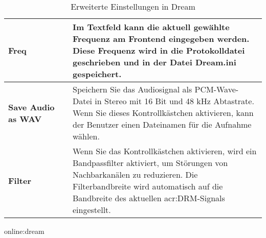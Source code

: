 \begin{table}[htb]
\begin{center}
\begin{tabular}{|p{0.25\linewidth} | p{0.75\linewidth}|}
			\midrule
			\textbf{Freq} & Im Textfeld kann die aktuell gewählte Frequenz am Frontend eingegeben werden. Diese Frequenz wird in die Protokolldatei geschrieben und in der Datei Dream.ini gespeichert.
			\\
			\midrule
			\textbf{Save Audio as WAV} & Speichern Sie das Audiosignal als PCM-Wave-Datei in Stereo mit 16 Bit und 48 kHz Abtastrate. Wenn Sie dieses Kontrollkästchen aktivieren, kann der Benutzer einen Dateinamen für die Aufnahme wählen. \\
			\midrule
			\textbf{Filter}& Wenn Sie das Kontrollkästchen aktivieren, wird ein Bandpassfilter aktiviert, um Störungen von Nachbarkanälen zu reduzieren. Die Filterbandbreite wird automatisch auf die Bandbreite des aktuellen \gls{acr:DRM}-Signals eingestellt.\\
			\bottomrule
		\end{tabular}
		\caption{Erweiterte Einstellungen in Dream}\gls{online:dream}
		\label{tab:advdream}
	\end{center}
\end{table}

